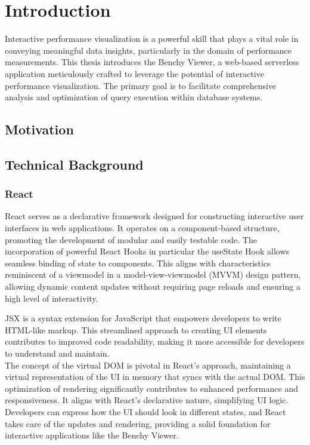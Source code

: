 
\chapter{Introduction}\label{chapter:introduction}

Interactive performance visualization is a powerful skill that plays a vital role in conveying meaningful data insights, particularly in the domain of performance measurements. This thesis introduces the Benchy Viewer, a web-based serverless application meticulously crafted to leverage the potential of interactive performance visualization. The primary goal is to facilitate comprehensive analysis and optimization of query execution within database systems.

\section{Motivation}
\section{Technical Background}
\subsection{React}

React \parencite*{react} serves as a declarative framework designed for constructing interactive user interfaces in web applications. It operates on a component-based structure, promoting the development of modular and easily testable code. The incorporation of powerful React Hooks \parencite*{react-hooks} in particular the useState Hook \parencite*{react-useState} allows seamless binding of state to components. This aligns with characteristics reminiscent of a viewmodel in a model-view-viewmodel (MVVM) design pattern, allowing dynamic content updates without requiring page reloads and ensuring a high level of interactivity.

JSX \parencite*{react-jsx} is a syntax extension for JavaScript that empowers developers to write HTML-like markup. This streamlined approach to creating UI elements contributes to improved code readability, making it more accessible for developers to understand and maintain.\\
The concept of the virtual DOM \parencite*{react-virtual-dom} is pivotal in React's approach, maintaining a virtual representation of the UI in memory that syncs with the actual DOM. This optimization of rendering significantly contributes to enhanced performance and responsiveness. It aligns with React's declarative nature, simplifying UI logic. Developers can express how the UI should look in different states, and React takes care of the updates and rendering, providing a solid foundation for interactive applications like the Benchy Viewer.

